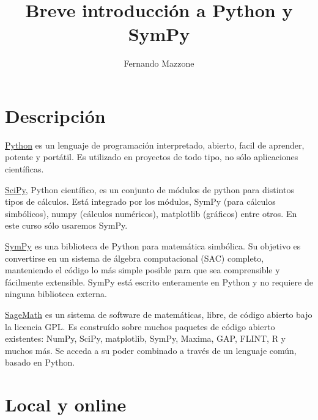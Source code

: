 \documentclass{article}
\title{Breve introducción a Python y SymPy}
\author{Fernando Mazzone}
\begin{document}
  \maketitle




\section[Descripción]{Descripción}

\href{https://www.python.org/}{Python} es un lenguaje de programación interpretado, abierto, facil de aprender, potente y portátil. Es utilizado en proyectos de todo tipo, no sólo aplicaciones científicas. 




\href{http://www.scipy.org/}{SciPy}, Python científico, es un conjunto de módulos de python para distintos tipos de cálculos. Está integrado por los módulos, SymPy (para cálculos simbólicos), numpy (cálculos numéricos), matplotlib (gráficos) entre otros.  En este curso sólo usaremos SymPy.




\href{http://www.sympy.org/}{SymPy}
es una biblioteca de Python para matemática simbólica. Su objetivo es convertirse en un sistema de álgebra computacional (SAC) completo, manteniendo el código lo más simple posible para que sea comprensible y fácilmente extensible. SymPy está escrito enteramente en Python y no requiere de ninguna biblioteca externa.

\href{http://www.sagemath.org/}{SageMath}  es un sistema de software de matemáticas, libre, de código abierto bajo la licencia GPL. Es construído sobre  muchos paquetes de código abierto existentes: NumPy, SciPy, matplotlib, SymPy, Maxima, GAP, FLINT, R y muchos más. Se acceda a su poder combinado a través de un lenguaje común, basado en Python.




\section{Local y online} 
\end{document}
